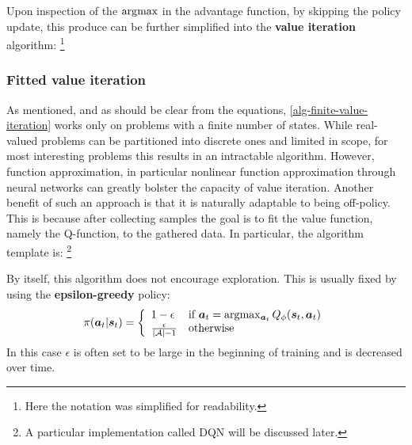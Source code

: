 Upon inspection of the $ \arg\!\max  $ in the advantage function, by skipping the policy update, this produce can be further simplified 
into the \textbf{value iteration} algorithm:
\footnote{Here the notation was simplified for readability.}


\subsubsection{Fitted value iteration}
As mentioned, and as should be clear from the equations, \ref{alg-finite-value-iteration} works only on
problems with a finite number of states.
While real-valued problems can be partitioned into discrete ones and limited in scope,
for most interesting problems this results in an intractable algorithm.
However, function approximation, in particular nonlinear function approximation through neural networks
can greatly bolster the capacity of value iteration.
Another benefit of such an approach is that it is naturally adaptable to being off-policy.
This is because after collecting samples the goal is to fit the value function, namely the Q-function, 
to the gathered data.
In particular, the algorithm template is:
\footnote{
A particular implementation called DQN
will be discussed later.}

By itself, this algorithm does not encourage exploration.
This is usually fixed by using the \textbf{epsilon-greedy} policy:
\begin{equation}
\pi(\bm{a}_{t}| \bm{s}_{t}) = 
\left\{
		\begin{array}{ll}
				1 - \epsilon & \text{if } \bm{a}_t = \arg\!\max_{\bm{a}_t} Q_\phi(\bm{s}_{t}, \bm{a}_{t}) \\
				\frac{\epsilon}{|\mathcal{A}| - 1} & \text{otherwise}
\end{array}
		\right.
\end{equation}
In this case $ \epsilon  $ is often set to be large in the beginning of training
and is decreased over time.

